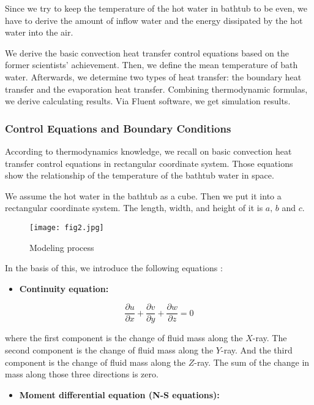 Since we try to keep the temperature of the hot water in bathtub to be even, we have to derive the amount of inflow water and the energy dissipated by the hot water into the air.

We derive the basic convection heat transfer control equations based on the former scientists’ achievement. Then, we define the mean temperature of bath water. Afterwards, we determine two types of heat transfer: the boundary heat transfer and the evaporation heat transfer. Combining thermodynamic formulas, we derive calculating results. Via Fluent software, we get simulation results.

\subsubsection{Control Equations and Boundary Conditions}

According to thermodynamics knowledge, we recall on basic convection
heat transfer control equations in rectangular coordinate system. Those
equations show the relationship of the temperature of the bathtub water in space.

We assume the hot water in the bathtub as a cube. Then we put it into a
rectangular coordinate system. The length, width, and height of it is $a,\, b$ and $c$.

\begin{figure}[h]
    \centering
    \texttt{[image: fig2.jpg]}
    \caption{Modeling process} \label{fig2}
\end{figure}

In the basis of this, we introduce the following equations \cite{5}:

\begin{itemize}
    \item {\bf Continuity equation:}
\end{itemize}

\begin{equation} \label{eq1}
    \frac{\partial u}{\partial x} + \frac{\partial v}{\partial y} +\frac{\partial w}{\partial z} =0
\end{equation}

\noindent where the first component is the change of fluid mass along the $X$-ray. The second component is the change of fluid mass along the $Y$-ray. And the third component is the change of fluid mass along the $Z$-ray. The sum of the change in mass along those three directions is zero.

\begin{itemize}
    \item {\bf Moment differential equation (N-S equations):}
\end{itemize}

